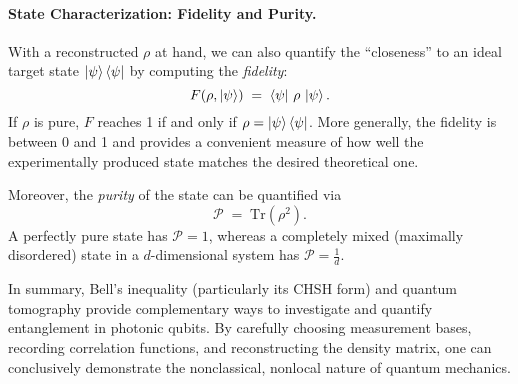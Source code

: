 \paragraph{State Characterization: Fidelity and Purity.}
With a reconstructed $\rho$ at hand, we can also quantify the ``closeness'' to an ideal target state $\ket{\psi}\bra{\psi}$ by computing the \emph{fidelity}:
\[
F(\rho, \ket{\psi}) \;=\; \bra{\psi}\,\rho\,\ket{\psi}.
\]
If $\rho$ is pure, $F$ reaches 1 if and only if $\rho = \ket{\psi}\bra{\psi}$. More generally, the fidelity is between 0 and 1 and provides a convenient measure of how well the experimentally produced state matches the desired theoretical one.

Moreover, the \emph{purity} of the state can be quantified via
\[
\mathcal{P} \;=\; \mathrm{Tr}(\rho^2).
\]
A perfectly pure state has $\mathcal{P}=1$, whereas a completely mixed (maximally disordered) state in a $d$-dimensional system has $\mathcal{P}=\frac{1}{d}$.

\bigskip

In summary, Bell’s inequality (particularly its CHSH form) and quantum tomography provide complementary ways to investigate and quantify entanglement in photonic qubits. By carefully choosing measurement bases, recording correlation functions, and reconstructing the density matrix, one can conclusively demonstrate the nonclassical, nonlocal nature of quantum mechanics.
